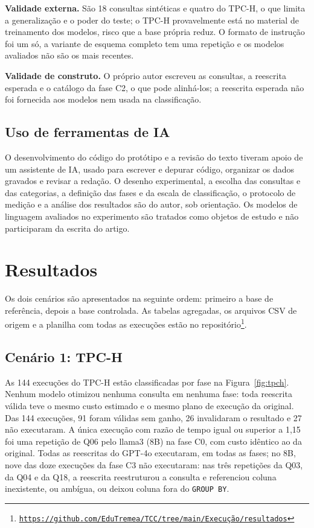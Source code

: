 \documentclass[12pt]{article}
\begin{document}
\textbf{Validade externa.} São 18 consultas sintéticas e quatro do TPC-H, o que limita a generalização e o poder do teste; o TPC-H provavelmente está no material de treinamento dos modelos, risco que a base própria reduz. O formato de instrução foi um só, a variante de esquema completo tem uma repetição e os modelos avaliados não são os mais recentes.

\textbf{Validade de construto.} O próprio autor escreveu as consultas, a reescrita esperada e o catálogo da fase C2, o que pode alinhá-los; a reescrita esperada não foi fornecida aos modelos nem usada na classificação.

\subsection{Uso de ferramentas de IA}

O desenvolvimento do código do protótipo e a revisão do texto tiveram apoio de um assistente de IA, usado para escrever e depurar código, organizar os dados gravados e revisar a redação. O desenho experimental, a escolha das consultas e das categorias, a definição das fases e da escala de classificação, o protocolo de medição e a análise dos resultados são do autor, sob orientação. Os modelos de linguagem avaliados no experimento são tratados como objetos de estudo e não participaram da escrita do artigo.

\section{Resultados}

Os dois cenários são apresentados na seguinte ordem: primeiro a base de referência, depois a base controlada. As tabelas agregadas, os arquivos CSV de origem e a planilha com todas as execuções estão no repositório\footnote{\href{https://github.com/EduTremea/TCC/tree/main/Execu\%C3\%A7\%C3\%A3o/resultados}{\texttt{https://github.com/EduTremea/TCC/tree/main/Execução/resultados}}}.

\subsection{Cenário 1: TPC-H}
\label{sec:tpch}

As 144 execuções do TPC-H estão classificadas por fase na Figura~\ref{fig:tpch}. Nenhum modelo otimizou nenhuma consulta em nenhuma fase: toda reescrita válida teve o mesmo custo estimado e o mesmo plano de execução da original. Das 144 execuções, 91 foram válidas sem ganho, 26 invalidaram o resultado e 27 não executaram. A única execução com razão de tempo igual ou superior a 1,15 foi uma repetição de Q06 pelo llama3 (8B) na fase C0, com custo idêntico ao da original. Todas as reescritas do GPT-4o executaram, em todas as fases; no 8B, nove das doze execuções da fase C3 não executaram: nas três repetições da Q03, da Q04 e da Q18, a reescrita reestruturou a consulta e referenciou coluna inexistente, ou ambígua, ou deixou coluna fora do \texttt{GROUP BY}.
\end{document}
